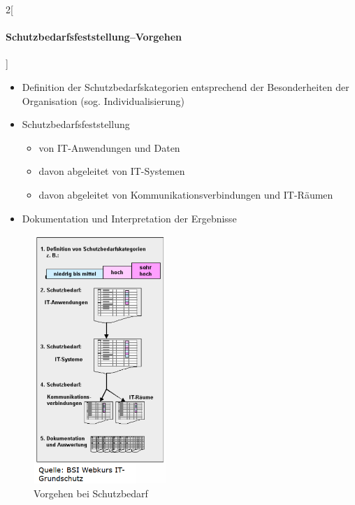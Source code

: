 \documentclass[10pt,a4paper]{article}
\begin{document}
\begin{multicols}{2}[\paragraph*{Schutzbedarfsfeststellung–Vorgehen}]
\begin{itemize}[noitemsep,topsep=0pt,leftmargin=*]
    \item Definition der Schutzbedarfskategorien entsprechend der Besonderheiten der Organisation (sog. Individualisierung)
    \item Schutzbedarfsfeststellung
    \begin{itemize}[noitemsep,topsep=0pt,leftmargin=*]
        \item von IT-Anwendungen und Daten
        \item davon abgeleitet von IT-Systemen
        \item davon abgeleitet von Kommunikationsverbindungen und IT-Räumen
    \end{itemize}
    \item Dokumentation und Interpretation der Ergebnisse
\end{itemize}\vspace*{\fill}
\columnbreak
\begin{figure}[H]
    \begin{center}
    \includegraphics[width=5cm]{images/Schutzbedarf_vorgehen.png}
    \caption{Vorgehen bei Schutzbedarf}
    \label{schutzbedarfvorgehen}
    \end{center}
\end{figure}
\end{multicols}
\end{document}
